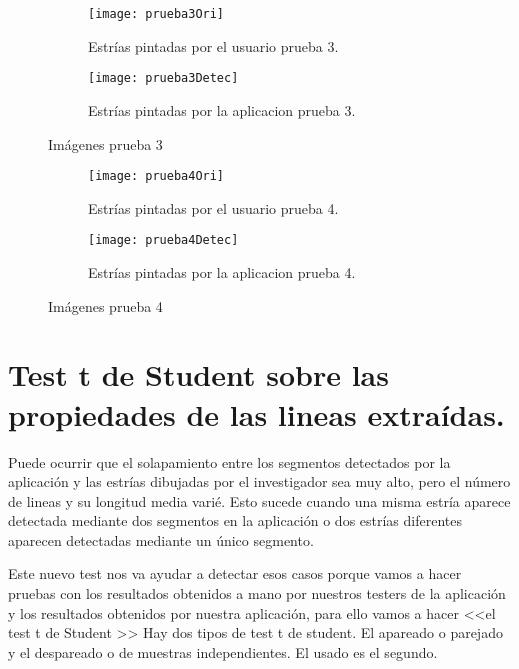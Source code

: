 \begin{figure}
	\begin{subfigure}[c]{.5\linewidth}
	\centering\large \texttt{[image: prueba3Ori]}
	\caption{Estrías pintadas por el usuario prueba 3.}\label{fig:orip3}
	\end{subfigure}%
	\begin{subfigure}[c]{.5\linewidth}
	\centering\large \texttt{[image: prueba3Detec]}
	\caption{Estrías pintadas por la aplicacion prueba 3.}\label{fig:calcp3}
	\end{subfigure}%
	\caption{Imágenes prueba 3}
	\label{fig:p3}

\end{figure}



\begin{figure}
	\begin{subfigure}[c]{.5\linewidth}
	\centering\large \texttt{[image: prueba4Ori]}
	\caption{Estrías pintadas por el usuario prueba 4.}\label{fig:orip4} 
	\end{subfigure}%
	\begin{subfigure}[c]{.5\linewidth}
	\centering\large \texttt{[image: prueba4Detec]}
	\caption{Estrías pintadas por la aplicacion prueba 4.}\label{fig:calcp4}
	\end{subfigure}%
	\caption{Imágenes prueba 4}
	\label{fig:p4}

\end{figure}

\section{Test t de Student sobre las propiedades de las lineas extraídas.}

Puede ocurrir que el solapamiento entre los segmentos detectados por la aplicación y las estrías dibujadas por el investigador sea muy alto, pero el número de lineas y su longitud media varié. Esto sucede cuando una misma estría aparece detectada mediante dos segmentos en la aplicación o dos estrías diferentes aparecen detectadas mediante un único segmento.

Este nuevo test nos va ayudar a detectar esos casos porque vamos a hacer pruebas con los resultados obtenidos a mano por nuestros testers de la aplicación y los resultados obtenidos por nuestra aplicación, para ello vamos a hacer <<el test t de Student \cite{wiki:testStude}>>
Hay dos tipos de test t de student. El apareado o parejado y el despareado o de muestras independientes. El usado es el segundo.

